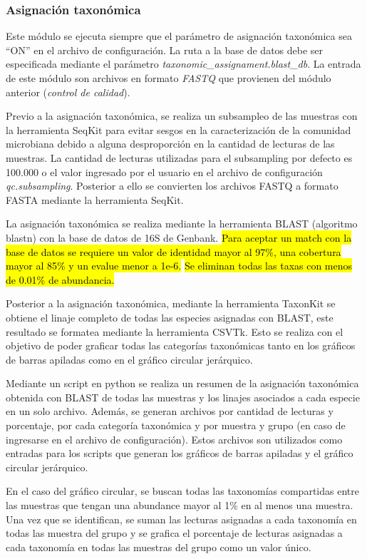 \subsubsection{Asignación taxonómica}
Este módulo se ejecuta siempre que el parámetro de asignación taxonómica sea ``ON'' en el archivo de configuración. 
La ruta a la base de datos debe ser especificada mediante el parámetro \textit{taxonomic\_assignament.blast\_db}.
La entrada de este módulo son archivos en formato \textit{FASTQ} que provienen del módulo anterior (\textit{control de calidad}).

Previo a la asignación taxonómica, se realiza un subsampleo de las muestras con la herramienta SeqKit para evitar sesgos en la caracterización de la comunidad microbiana debido a alguna desproporción en la cantidad de lecturas de las muestras.
La cantidad de lecturas utilizadas para el subsampling por defecto es 100.000 o el valor ingresado por el usuario en el archivo de configuración \textit{qc.subsampling}.
Posterior a ello se convierten los archivos FASTQ a formato FASTA mediante la herramienta SeqKit.

La asignación taxonómica se realiza mediante la herramienta BLAST (algoritmo blastn) con la base de datos de 16S de Genbank. 
\hl{Para aceptar un match con la base de datos se requiere un valor de identidad mayor al 97\%, una cobertura mayor al 85\% y un evalue menor a 1e-6.}
\hl{Se eliminan todas las taxas con menos de 0.01\% de abundancia.}

Posterior a la asignación taxonómica, mediante la herramienta TaxonKit se obtiene el linaje completo de todas las especies asignadas con BLAST, este resultado se formatea mediante la herramienta CSVTk. 
Esto se realiza con el objetivo de poder graficar todas las categorías taxonómicas tanto en los gráficos de barras apiladas como en el gráfico circular jerárquico.

Mediante un script en python se realiza un resumen de la asignación taxonómica obtenida con BLAST de todas las muestras y los linajes asociados a cada especie en un solo archivo. Además, se generan archivos por cantidad de lecturas y porcentaje, por cada categoría taxonómica y por muestra y grupo (en caso de ingresarse en el archivo de configuración).
Estos archivos son utilizados como entradas para los scripts que generan los gráficos de barras apiladas y  el gráfico circular jerárquico.


En el caso del gráfico circular, se buscan todas las taxonomías compartidas entre las muestras que tengan una abundance mayor al 1\% en al menos una muestra. 
Una vez que se identifican, se suman las lecturas asignadas a cada taxonomía en todas las muestra del grupo y se grafica el porcentaje de lecturas asignadas a cada taxonomía en todas las muestras del grupo como un valor único.



